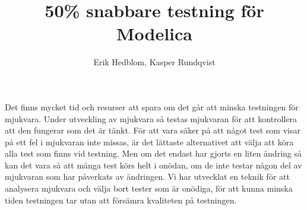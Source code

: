 \documentclass{popsci}
\author{Erik Hedblom, Kasper Rundqvist}
\title{50\% snabbare testning för Modelica}
\begin{document}


{\noindent Det finns mycket tid och resurser att spara om det går att minska testningen för mjukvara. Under utveckling av mjukvara så testas mjukvaran för att kontrollera att den fungerar som det är tänkt. För att vara säker på att något test som visar på ett fel i mjukvaran inte missas, är det lättaste alternativet att välja att köra alla test som finns vid testning. Men om det endast har gjorts en liten ändring så kan det vara så att många test körs helt i onödan, om de inte testar någon del av mjukvaran som har påverkats av ändringen. Vi har utvecklat en teknik för att analysera mjukvara och välja bort tester som är onödiga, för att kunna minska tiden testningen tar utan att försämra kvaliteten på testningen.
}
\end{document}
